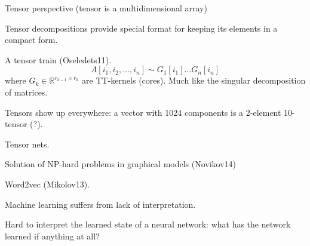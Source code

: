 \documentclass[a4paper]{article}
\newcommand{\clo}[1]{{\left [ #1 \right ]}}
\newcommand{\Real}{\mathbb{R}}
\begin{document}
Tensor perspective (tensor is a multidimensional array)

Tensor decompositions provide special format for keeping its elements in a compact form.

A tensor train (Oseledets11).
\[A\clo{i_1,i_2,\ldots,i_n} \sim G_1\clo{i_1}\ldots G_n\clo{i_n}\]
where $G_k\in \Real^{r_{k-1}\times r_k}$ are TT-kernels (cores).
Much like the singular decomposition of matrices.

Tensors show up everywhere: a vector with 1024 components is a 2-element 10-tensor (?).

Tensor nets.

Solution of NP-hard problems in graphical models (Novikov14)

Word2vec (Mikolov13).


Machine learning suffers from lack of interpretation.

Hard to interpret the learned state of a neural network: what has the network learned if anything at all?


\end{document}
